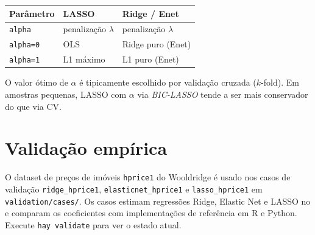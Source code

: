 \begin{center}
\begin{tabular}{lll}
\toprule
\textbf{Parâmetro} & \textbf{LASSO} & \textbf{Ridge / Enet} \\
\midrule
\texttt{alpha} & penalização $\lambda$ & penalização $\lambda$ \\
\texttt{alpha=0} & OLS & Ridge puro (Enet) \\
\texttt{alpha=1} & L1 máximo & L1 puro (Enet) \\
\bottomrule
\end{tabular}
\end{center}

\begin{nota}
  O valor ótimo de $\alpha$ é tipicamente escolhido por validação cruzada
  ($k$-fold). Em amostras pequenas, LASSO com $\alpha$ via \emph{BIC-LASSO}
  tende a ser mais conservador do que via CV.
\end{nota}

\section{Validação empírica}

O dataset de preços de imóveis \texttt{hprice1} do Wooldridge é usado nos casos
de validação \texttt{ridge\_hprice1}, \texttt{elasticnet\_hprice1} e
\texttt{lasso\_hprice1} em \texttt{validation/cases/}. Os casos estimam
regressões Ridge, Elastic Net e LASSO no \hayashi{} e comparam os coeficientes
com implementações de referência em R e Python. Execute \lstinline{hay validate}
para ver o estado atual.
